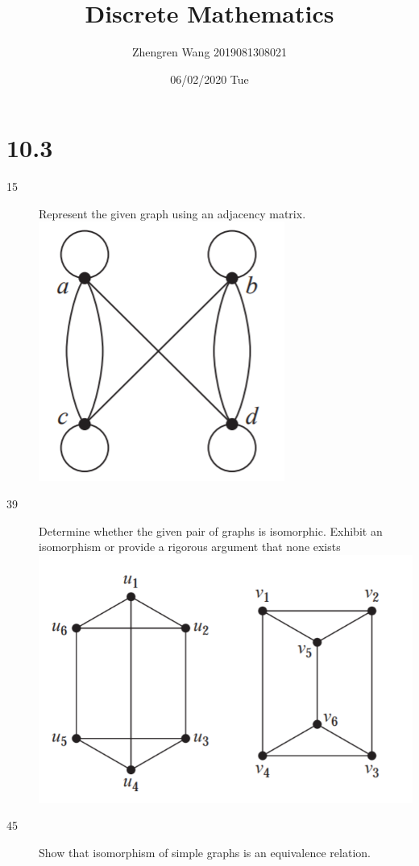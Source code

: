 \documentclass[UTF8]{article}
\title{Discrete Mathematics}
\author{Zhengren Wang 2019081308021}
\date{06/02/2020 Tue}
\begin{document}
\maketitle 

\part{10.3}
\begin{description}
    \item[15]Represent the given graph using an adjacency matrix. \\
        \includegraphics[scale=0.3]{../imgs/10_3_15.png}



    \item[39]Determine whether the given pair of graphs is isomorphic. Exhibit an isomorphism or provide a rigorous argument that none exists  \\
        \includegraphics[scale=0.3]{../imgs/10_3_39.png}


    \item[45]Show that isomorphism of simple graphs is an equivalence relation. \\

\end{description}
\end{document}
